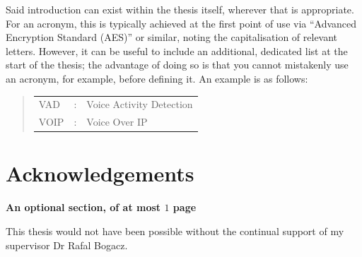 \documentclass[ %
                    author={Sam Phippen},
                supervisor={Dr. Rafal Bogacz},
                     title={Real time voice activity detectors in noisy personal computing environments},
                  subtitle={},
                    degree={MEng},
                      year={2012} ]{thesis}
\begin{document}
Said introduction can exist within the thesis itself, wherever that is
appropriate.  For an acronym, this is typically achieved at the first point 
of use via ``Advanced Encryption Standard (AES)'' or similar, noting the 
capitalisation of relevant letters.  However, it can be useful to include 
an additional, dedicated list at the start of the thesis; the advantage of 
doing so is that you cannot mistakenly use an acronym, for example, 
before defining it.  An example is as follows:

\begin{quote}
\noindent
\begin{tabular}{lcl}
VAD                 &:     & Voice Activity Detection                 \\
VOIP                &:     & Voice Over IP\\
\end{tabular}
\end{quote}


\chapter*{Acknowledgements}

{\bf An optional section, of at most $1$ page}
\vspace{1cm} 

\noindent This thesis would not have been possible without the continual
support of my supervisor Dr Rafal Bogacz.


%
\end{document}
